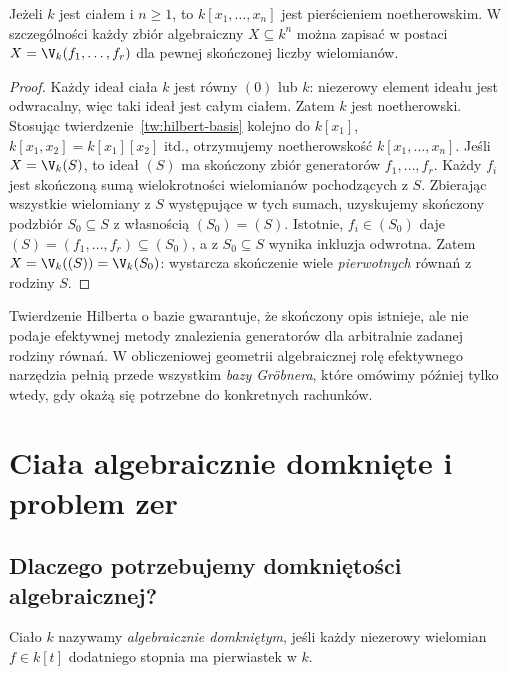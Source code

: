 \begin{wniosek}
\label{wn:noetherian-polys}
Jeżeli $k$ jest ciałem i $n\ge1$, to $k[x_1,\dots,x_n]$
jest pierścieniem noetherowskim. W szczególności każdy zbiór
algebraiczny $X\subseteq k^n$ można zapisać w postaci
$X=\V_k(f_1,\dots,f_r)$ dla pewnej skończonej liczby wielomianów.
\end{wniosek}
\begin{proof}
Każdy ideał ciała $k$ jest równy $(0)$ lub $k$:
niezerowy element ideału jest odwracalny, więc taki ideał jest całym
ciałem. Zatem $k$ jest noetherowski.
Stosując twierdzenie~\ref{tw:hilbert-basis} kolejno do
$k[x_1]$, $k[x_1,x_2]=k[x_1][x_2]$ itd., otrzymujemy
noetherowskość $k[x_1,\dots,x_n]$.
Jeśli $X=\V_k(S)$, to ideał $(S)$ ma skończony zbiór
generatorów $f_1,\dots,f_r$. Każdy $f_i$ jest skończoną
sumą wielokrotności wielomianów pochodzących z $S$.
Zbierając wszystkie wielomiany z $S$ występujące w tych
sumach, uzyskujemy skończony podzbiór $S_0\subseteq S$
z własnością $(S_0)=(S)$. Istotnie, $f_i\in(S_0)$ daje
$(S)=(f_1,\dots,f_r)\subseteq(S_0)$, a z $S_0\subseteq S$
wynika inkluzja odwrotna. Zatem
$X=\V_k((S))=\V_k(S_0)$: wystarcza skończenie wiele
\emph{pierwotnych} równań z rodziny $S$.
\end{proof}

\begin{uwaga}
Twierdzenie Hilberta o bazie gwarantuje, że skończony opis istnieje,
ale nie podaje efektywnej metody znalezienia generatorów dla
arbitralnie zadanej rodziny równań. W obliczeniowej geometrii
algebraicznej rolę efektywnego narzędzia pełnią przede wszystkim
\emph{bazy Gröbnera}, które omówimy później tylko wtedy,
gdy okażą się potrzebne do konkretnych rachunków.
\end{uwaga}

\section{Ciała algebraicznie domknięte i problem zer}

\subsection{Dlaczego potrzebujemy domkniętości algebraicznej?}

\begin{definicja}
Ciało $k$ nazywamy \emph{algebraicznie domkniętym}, jeśli każdy
niezerowy wielomian $f\in k[t]$ dodatniego stopnia ma pierwiastek w $k$.
\end{definicja}

